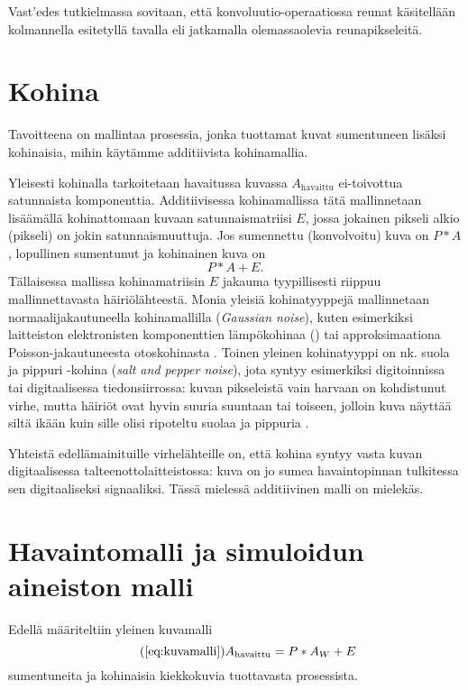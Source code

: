 Vast'edes tutkielmassa sovitaan, että konvoluutio-operaatiossa reunat käsitellään kolmannella esitetyllä tavalla eli jatkamalla olemassaolevia reunapikseleitä.

\section{Kohina}
\label{sec:kohina}

Tavoitteena on mallintaa prosessia, jonka tuottamat kuvat sumentuneen lisäksi kohinaisia, mihin käytämme additiivista kohinamallia.

Yleisesti kohinalla tarkoitetaan havaitussa kuvassa $A_\text{havaittu}$ ei-toivottua satunnaista komponenttia.
Additiivisessa kohinamallissa tätä mallinnetaan lisäämällä kohinattomaan kuvaan satunnaismatriisi $E$,
jossa jokainen pikseli alkio (pikseli) on jokin satunnaismuuttuja.
Jos sumennettu (konvolvoitu) kuva on $P \ast A$, lopullinen sumentunut ja kohinainen kuva on
\begin{equation*}
    P \ast A + E.
\end{equation*}
Tällaisessa mallissa kohinamatriisin $E$ jakauma tyypillisesti riippuu mallinnettavasta häiriölähteestä.
Monia yleisiä kohinatyyppejä mallinnetaan normaalijakautuneella kohinamallilla (\emph{Gaussian noise}),
kuten esimerkiksi laitteiston elektronisten komponenttien lämpökohinaa (\cite{boncelet05bovik}) tai approksimaationa Poisson-jakautuneesta otoskohinasta \cite[Ks. esim.][ luku 3.4.5]{jähne}.
Toinen yleinen kohinatyyppi on nk. suola ja pippuri -kohina (\emph{salt and pepper noise}), jota syntyy esimerkiksi digitoinnissa tai digitaalisessa tiedonsiirrossa: kuvan pikseleistä vain harvaan on kohdistunut virhe, mutta häiriöt ovat hyvin suuria suuntaan tai toiseen,
jolloin kuva näyttää siltä ikään kuin sille olisi ripoteltu suolaa ja pippuria \cite{boncelet05bovik}.

Yhteistä edellämainituille virhelähteille on, että kohina syntyy vasta kuvan digitaalisessa talteenottolaitteistossa:
kuva on jo sumea havaintopinnan tulkitessa sen digitaaliseksi signaaliksi.
Tässä mielessä additiivinen malli on mielekäs.


\section{Havaintomalli ja simuloidun aineiston malli}
\label{sec:simuloitu_aineisto}

Edellä määriteltiin yleinen kuvamalli
\begin{equation*}
    \tag{\ref{eq:kuvamalli}}
    A_\text{havaittu} = P \ast A_W + E
\end{equation*}
sumentuneita ja kohinaisia kiekkokuvia tuottavasta prosessista.

